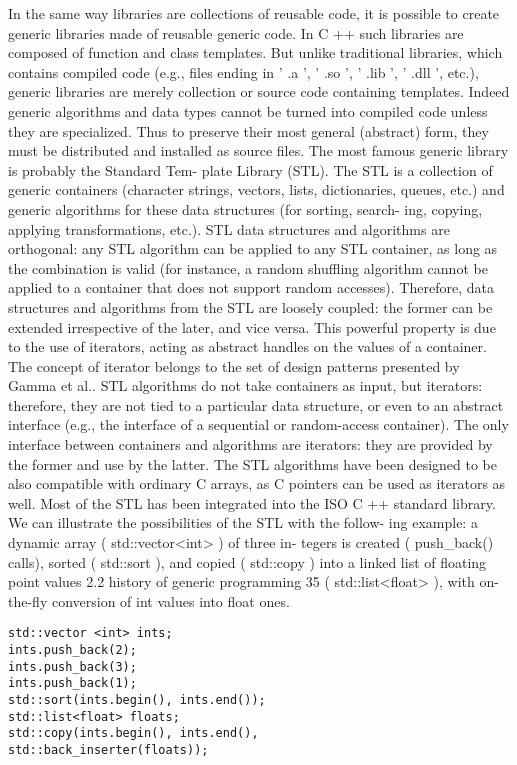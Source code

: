 In the same way libraries are collections of reusable code, it is
possible to create generic libraries made of reusable generic code.
In C ++ such libraries are composed of function and class templates.
But unlike traditional libraries, which contains compiled code (e.g.,
files ending in ' .a ', ' .so ', ' .lib ', ' .dll ', etc.), generic libraries are
merely collection or source code containing templates. Indeed
generic algorithms and data types cannot be turned into compiled
code unless they are specialized. Thus to preserve their most
general (abstract) form, they must be distributed and installed as
source files.
The most famous generic library is probably the Standard Tem-
plate Library (STL). The STL is a collection of generic containers
(character strings, vectors, lists, dictionaries, queues, etc.) and
generic algorithms for these data structures (for sorting, search-
ing, copying, applying transformations, etc.).
STL data structures and algorithms are orthogonal: any STL
algorithm can be applied to any STL container, as long as the
combination is valid (for instance, a random shuffling algorithm
cannot be applied to a container that does not support random
accesses). Therefore, data structures and algorithms from the
STL are loosely coupled: the former can be extended irrespective
of the later, and vice versa. This powerful property is due to
the use of iterators, acting as abstract handles on the values of
a container. The concept of iterator belongs to the set of design
patterns presented by Gamma et al.. STL algorithms do not
take containers as input, but iterators: therefore, they are not tied
to a particular data structure, or even to an abstract interface (e.g.,
the interface of a sequential or random-access container). The
only interface between containers and algorithms are iterators:
they are provided by the former and use by the latter. The
STL algorithms have been designed to be also compatible with
ordinary C arrays, as C pointers can be used as iterators as well.
Most of the STL has been integrated into the ISO C ++ standard
library.
We can illustrate the possibilities of the STL with the follow-
ing example: a dynamic array ( std::vector<int> ) of three in-
tegers is created ( push_back() calls), sorted ( std::sort ), and
copied ( std::copy ) into a linked list of floating point values
2.2 history of generic programming 35
( std::list<float> ), with on-the-fly conversion of int values
into float ones.

\begin{verbatim}
std::vector <int> ints;
ints.push_back(2);
ints.push_back(3);
ints.push_back(1);
std::sort(ints.begin(), ints.end());
std::list<float> floats;
std::copy(ints.begin(), ints.end(),
std::back_inserter(floats));
\end{verbatim}

